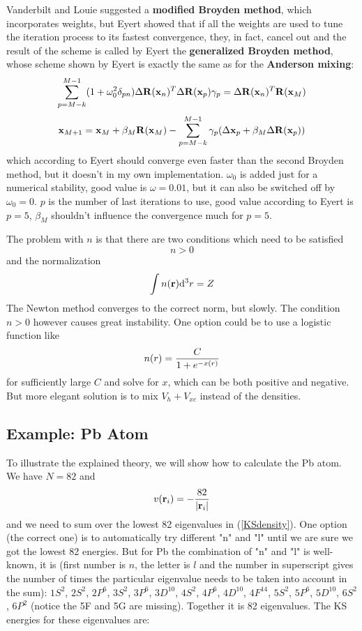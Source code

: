 Vanderbilt and Louie \cite{vanderbiltlouie} suggested a \textbf{modified Broyden method}, which incorporates weights, but Eyert \cite{eyert} showed that if all the weights are used to tune the iteration process to its fastest convergence, they, in fact, cancel out and the result of the scheme is called by Eyert the \textbf{generalized Broyden method}, whose scheme shown by Eyert is exactly the same as for the \textbf{Anderson mixing}: 
\begin{equation*}
  \sum_{p=M-k}^{M-1}(1+\omega_0^2\delta_{pn})\Delta{\bf R}({\bf x}_n)^T\Delta{\bf R}({\bf x}_p) \gamma_p =\Delta{\bf R}({\bf x}_n)^T{\bf R}({\bf x}_M)
\end{equation*}
\begin{equation*}
  {\bf x}_{M+1}={\bf x}_M+\beta_M{\bf R}({\bf x}_M)-\sum_{p=M-k}^{M-1}\gamma_p (\Delta{\bf x}_p+\beta_M\Delta{\bf R}({\bf x}_p))
\end{equation*}
which according to Eyert should converge even faster than the second Broyden method, but it doesn't in my own implementation. $\omega_0$ is added just for a numerical stability, good value is $\omega=0.01$, but it can also be switched off by $\omega_0=0$. $p$ is the number of last iterations to use, good value according to Eyert is $p=5$, $\beta_M$ shouldn't influence the convergence much for $p=5$.

The problem with $n$ is that there are two conditions which need to be satisfied 
\begin{equation*}
  n>0
\end{equation*}
and the normalization 
\begin{equation*}
  \int n({\bf r}) {\rm d}^3r=Z
\end{equation*}
The Newton method converges to the correct norm, but slowly. The condition $n>0$ however causes great instability. One option could be to use a logistic function like 
\begin{equation*}
  n(r)={C\over 1+e^{-x(r)}}
\end{equation*}
for sufficiently large $C$ and solve for $x$, which can be both positive and negative. But more elegant solution is to mix $V_h+V_{xc}$ instead of the densities.

\subsection{Example: Pb Atom}

To illustrate the explained theory, we will show how to calculate the Pb atom. We have $N=82$ and 
\begin{equation*}
  v({\bf r}_i)=-{82\over |{\bf r}_i|}
\end{equation*}
and we need to sum over the lowest 82 eigenvalues in (\ref{KSdensity}). One option (the correct one) is to automatically try different "n" and "l" until we are sure we got the lowest 82 energies. But for Pb the combination of "n" and "l" is well-known, it is (first number is $n$, the letter is $l$ and the number in superscript gives the number of times the particular eigenvalue needs to be taken into account in the sum): $1S^2$, $2S^2$, $2P^6$, $3S^2$, $3P^6$, $3D^{10}$, $4S^2$, $4P^6$, $4D^{10}$, $4F^{14}$, $5S^2$, $5P^6$, $5D^{10}$, $6S^2$, $6P^2$ (notice the 5F and 5G are missing). Together it is 82 eigenvalues. The KS energies for these eigenvalues are:

